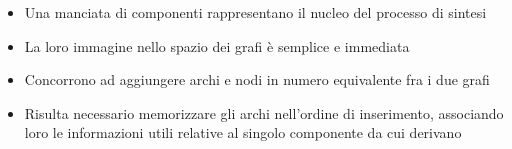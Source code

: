 \begin{frame}
 \begin{itemize}
  \item<1-> Una manciata di componenti rappresentano il nucleo del processo di sintesi
  \item<2-> La loro immagine nello spazio dei grafi è semplice e immediata
  \item<3-> Concorrono ad aggiungere archi e nodi in numero equivalente fra i due grafi
  \item<4-> Risulta necessario memorizzare gli archi nell'ordine di inserimento, associando loro le informazioni utili relative al singolo componente da cui derivano
 \end{itemize}

\end{frame}


